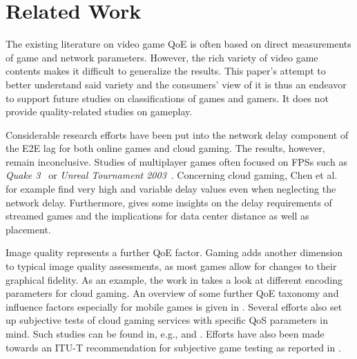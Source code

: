 \section{Related Work}
\label{sec:relatedwork}

The existing literature on video game \gls{QoE} is often based on
direct measurements of game and network parameters. However, the
rich variety of video game contents makes it difficult to generalize
the results. This paper's attempt to better understand said variety
and the consumers' view of it is thus an endeavor to support future
studies on classifications of games and gamers.
It does not provide quality-related studies on gameplay.

Considerable research efforts have been put into the network delay component of the \gls{E2E} lag for both online games and cloud gaming. The results, however, remain inconclusive. Studies of multiplayer games often focused on \glspl{FPS} such as \textit{Quake 3}~\cite{1266180} or \textit{Unreal Tournament 2003}~\cite{Beigbeder:2004:ELL:1016540.1016556}. Concerning cloud gaming, Chen et al.~\cite{6670099} for example find very high and variable delay values even when neglecting the network delay. Furthermore, \cite{Choy:2012:BSC:2501560.2501563} gives some insights on the delay requirements of streamed games and the implications for data center distance as well as placement.

Image quality represents a further \gls{QoE} factor. Gaming adds
another dimension to typical image quality assessments, as most
games allow for changes to their graphical fidelity.
As an example, the work in \cite{slivarimpact} takes a look at different encoding parameters for cloud gaming.%
An overview of some further \gls{QoE} taxonomy and influence factors especially for mobile games is given in \cite{beyer2014typedisplaydelayimpact}. Several efforts also set up subjective tests of cloud gaming services with specific \gls{QoS} parameters in mind. Such studies can be found in, e.g., \cite{Jarschel20132883} and  \cite{6614351}. Efforts have also been made towards an \acrshort{ITU-T} recommendation for subjective game testing as reported in \cite{mollertowards}.

